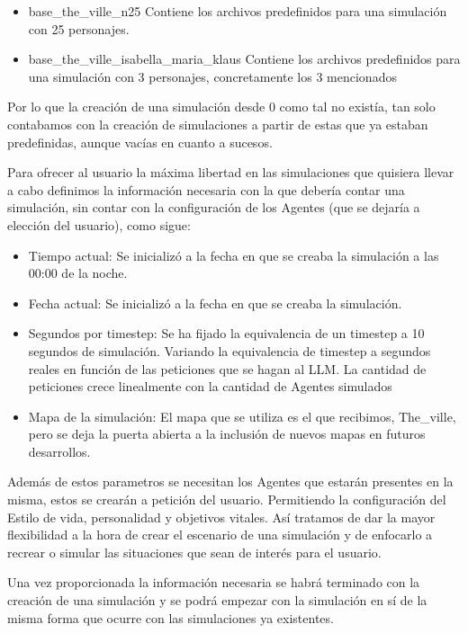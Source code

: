 \begin{itemize}
	\item{base\_the\_ville\_n25} Contiene los archivos predefinidos para una simulación con 25 personajes.
	\item{base\_the\_ville\_isabella\_maria\_klaus} Contiene los archivos predefinidos para una simulación con 3 personajes, concretamente los 3 mencionados
\end{itemize}

Por lo que la creación de una simulación desde 0 como tal no existía, tan solo contabamos con la creación de simulaciones a partir de estas que ya estaban predefinidas, aunque vacías en cuanto a sucesos.

Para ofrecer al usuario la máxima libertad en las simulaciones que quisiera llevar a cabo definimos la información necesaria con la que debería contar una simulación, sin contar con la configuración de los Agentes (que se dejaría a elección del usuario), como sigue:

\begin{itemize}
	\item{Tiempo actual}: Se inicializó a la fecha en que se creaba la simulación a las 00:00 de la noche.
	\item{Fecha actual}: Se inicializó a la fecha en que se creaba la simulación.
	\item{Segundos por timestep}: Se ha fijado la equivalencia de un timestep a 10 segundos de simulación. Variando la equivalencia de timestep a segundos reales en función de las peticiones que se hagan al LLM. La cantidad de peticiones crece linealmente con la cantidad de Agentes simulados
	\item{Mapa de la simulación}: El mapa que se utiliza es el que recibimos, The\_ville, pero se deja la puerta abierta a la inclusión de nuevos mapas en futuros desarrollos.
\end{itemize}

Además de estos parametros se necesitan los Agentes que estarán presentes en la misma, estos se crearán a petición del usuario. Permitiendo la configuración del Estilo de vida, personalidad y objetivos vitales. Así tratamos de dar la mayor flexibilidad a la hora de crear el escenario de una simulación y de enfocarlo a recrear o simular las situaciones que sean de interés para el usuario.

Una vez proporcionada la información necesaria se habrá terminado con la creación de una simulación y se podrá empezar con la simulación en sí de la misma forma que ocurre con las simulaciones ya existentes.